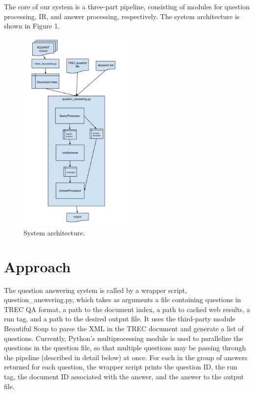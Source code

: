 \documentclass[11pt]{article}
\begin{document}
The core of our system is a three-part pipeline, consisting of modules for question processing, IR, and answer processing, respectively. The system architecture is shown in Figure 1.

\begin{figure}
  \centering
    \includegraphics[width=0.5\textwidth]{system_architecture.jpg}
 \caption{System architecture.}
\end{figure}

\section{Approach}

The question answering system is called by a wrapper script, question\_answering.py, which takes as arguments a file containing questions in TREC QA format, a path to the document index, a path to cached web results, a run tag, and a path to the desired output file. It uses the third-party module Beautiful Soup to parse the XML in the TREC document and generate a list of questions. Currently, Python's multiprocessing module is used to parallelize the questions in the question file, so that multiple questions may be passing through the pipeline (described in detail below) at once. For each in the group of answers returned for each question, the wrapper script prints the question ID, the run tag, the document ID associated with the answer, and the answer to the output file.
\end{document}
